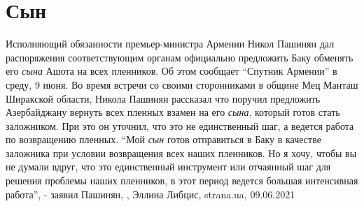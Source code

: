  
 
 
 
 
\chapter{Сын}
\label{sec:slova.syn}

Исполняющий обязанности премьер-министра Армении Никол Пашинян дал распоряжения
соответствующим органам официально предложить Баку обменять его \emph{сына} Ашота на
всех пленников. Об этом сообщает \enquote{Спутник Армении} в среду, 9 июня. Во
время встречи со своими сторонниками в общине Мец Манташ Ширакской области,
Никола Пашинян рассказал что поручил предложить Азербайджану вернуть всех
пленных взамен на его \emph{сына}, который готов стать заложником. При это он уточнил,
что это не единственный шаг, а ведется работа по возвращению пленных.
\enquote{Мой \emph{сын} готов отправиться в Баку в качестве заложника при условии
возвращения всех наших пленников. Но я хочу, чтобы вы не думали вдруг, что это
единственный инструмент или отчаянный шаг для решения проблемы наших пленников,
в этот период ведется большая интенсивная работа}, - заявил Пашинян,
, Эллина Либцис, strana.ua, 09.06.2021

